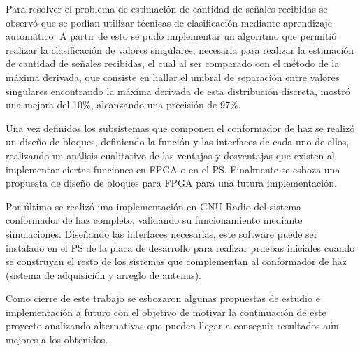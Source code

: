 Para resolver el problema de estimación de cantidad de señales recibidas se observó que se podían utilizar técnicas de clasificación mediante aprendizaje automático. A partir de esto se pudo implementar un algoritmo que permitió realizar la clasificación de valores singulares, necesaria para realizar la estimación de cantidad de señales recibidas, el cual al ser comparado con el método de la máxima derivada, que consiste en hallar el umbral de separación entre valores singulares encontrando la máxima derivada de esta distribución discreta, mostró una mejora del 10\%, alcanzando una precisión de 97\%.

Una vez definidos los subsistemas que componen el conformador de haz se realizó un diseño de bloques, definiendo la función y las interfaces de cada uno de ellos, realizando un análisis cualitativo de las ventajas y desventajas que existen al implementar ciertas funciones en FPGA o en el PS. Finalmente se esboza una propuesta de diseño de bloques para FPGA para una futura implementación.

Por último se realizó una implementación en GNU Radio del sistema conformador de haz completo, validando su funcionamiento mediante simulaciones. Diseñando las interfaces necesarias, este software puede ser instalado en el PS de la placa de desarrollo para realizar pruebas iniciales cuando se construyan el resto de los sistemas que complementan al conformador de haz (sistema de adquisición y arreglo de antenas).

Como cierre de este trabajo se esbozaron algunas propuestas de estudio e implementación a futuro con el objetivo de motivar la continuación de este proyecto analizando alternativas que pueden llegar a conseguir resultados aún mejores a los obtenidos.